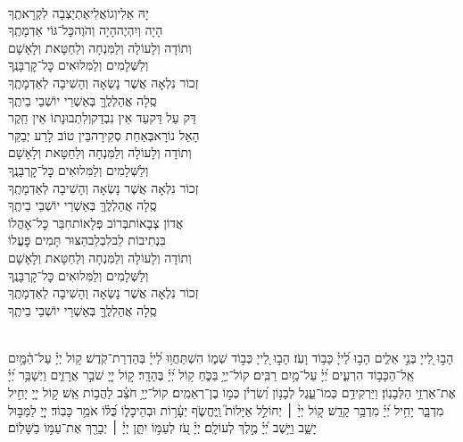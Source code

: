 \documentclass[twoside, openany, parskip=half, 11pt]{book}
\begin{document}
\begin{sometimes}
\negline
\begin{narrow}
\\
יָהּ אֵלִי\hfill וְגוֹאֲלִי\hfill אֶתְיַצְבָה לִקְרָאתֶֽךָ\\
הָיָה וְיִהְיֶה\hfill הָיָה וְהֹוֶה\hfill כׇּל־גּוֹי אַדְמָתֶֽךָ\\
וְתוֹדָה וְלָעוֹלָה וְלַמִּנְחָה וְלַחַטָּאת וְלָאָשָׁם \\
וְלַשְּׁלָמִים וְלַמִּלוּאִים כׇּל־קׇרְבָּנֶֽךָ\\
זְכוֹר נִלְאָה אֲשֶׁר נָשְׂאָה וְהָשִׁיבָה לְאַדְמָתֶֽךָ\\
סֶֽלָה אֲהַלְלֶֽךָּ בְּאַשְׁרֵי יוֹשְׁבֵי בֵיתֶֽךָ\\
דַּק עַל דַּק\hfill עַד אֵין נִבְדַק\hfill וְלִתְבוּנָתוֹ אֵין חֵֽקֶר\\
הָאֵל נוֹרָא\hfill בְּאַחַת סְקִירָה\hfill בֵּין טוֹב לָרַע יְבַקֵּר\\
וְתוֹדָה וְלָעוֹלָה וְלַמִּנְחָה וְלַחַטָּאת וְלָאָשָׁם \\
וְלַשְּׁלָמִים וְלַמִּלוּאִים כׇּל־קׇרְבָּנֶֽךָ\\
זְכוֹר נִלְאָה אֲשֶׁר נָשְׂאָה וְהָשִׁיבָה לְאַדְמָתֶֽךָ\\
סֶֽלָה אֲהַלְלֶֽךָּ בְּאַשְׁרֵי יוֹשְׁבֵי בֵיתֶֽךָ\\
אֲדוֹן צְבָאוֹת\hfill בְּרוֹב פְּלָאוֹת\hfill חִבֵּר כׇּל־אׇהֳלוֹ\\
בִּנְתִיבוֹת לֵב\hfill לִבְלֵב\hfill הַצּוּר תָּמִים פׇּעֳלוֹ\\
וְתוֹדָה וְלָעוֹלָה וְלַמִּנְחָה וְלַחַטָּאת וְלָאָשָׁם \\
וְלַשְּׁלָמִים וְלַמִּלוּאִים כׇּל־קׇרְבָּנֶֽךָ\\
זְכוֹר נִלְאָה אֲשֶׁר נָשְׂאָה וְהָשִׁיבָה לְאַדְמָתֶֽךָ\\
סֶֽלָה אֲהַלְלֶֽךָּ בְּאַשְׁרֵי יוֹשְׁבֵי בֵיתֶֽךָ
\end{narrow}

\end{sometimes}

\sepline

\ashrei

\yehalelu

\\
%
הָב֣וּ לַ֭ייָ בְּנֵ֣י אֵלִ֑ים הָב֥וּ לַ֝ייָ֗ כָּב֥וֹד וָעֹֽז׃
הָב֣וּ לַ֭ייָ כְּב֣וֹד שְׁמ֑וֹ הִשְׁתַּחֲו֥וּ לַ֝ייָ֗ בְּהַדְרַת־קֹֽדֶשׁ׃
ק֥וֹל יְיָ֗ עַל־הַ֫מָּ֥יִם אֵֽל־הַכָּב֥וֹד הִרְעִ֑ים יְ֝יָ֗ עַל־מַ֥יִם רַבִּֽים׃
קוֹל־יְיָ֥ בַּכֹּ֑חַ ק֥וֹל יְ֝יָ֗ בֶּהָדָֽר׃
ק֣וֹל יְיָ֭ שֹׁבֵ֣ר אֲרָזִ֑ים וַיְשַׁבֵּ֥ר יְ֝יָ֗ אֶת־אַרְזֵ֥י הַלְּבָנֽוֹן׃
וַיַּרְקִידֵ֥ם כְּמוֹ־עֵ֑גֶל לְבָנ֥וֹן וְ֝שִׂרְיֹ֗ן כְּמ֣וֹ בֶן־רְאֵמִֽים׃
קוֹל־יְיָ֥ חֹצֵ֗ב לַהֲב֥וֹת אֵֽשׁ׃
ק֣וֹל יְיָ֭ יָחִ֣יל מִדְבָּ֑ר יָחִ֥יל יְ֝יָ֗ מִדְבַּ֥ר קָדֵֽשׁ׃
ק֤וֹל יְיָ֨ ׀ יְחוֹלֵ֣ל אַיָּלוֹת֮ וַֽיֶּחֱשֹׂ֢ף יְעָ֫ר֥וֹת וּבְהֵיכָל֑וֹ כֻּ֝לּ֗וֹ אֹמֵ֥ר כָּבֽוֹד׃
יְיָ֭ לַמַּבּ֣וּל יָשָׁ֑ב וַיֵּ֥שֶׁב יְ֝יָ֗ מֶ֣לֶךְ לְעוֹלָֽם׃
יְיָ֗ עֹ֭ז לְעַמּ֣וֹ יִתֵּ֑ן יְיָ֓ ׀ יְבָרֵ֖ךְ אֶת־עַמּ֣וֹ בַשָּׁלֽוֹם׃
\end{document}
